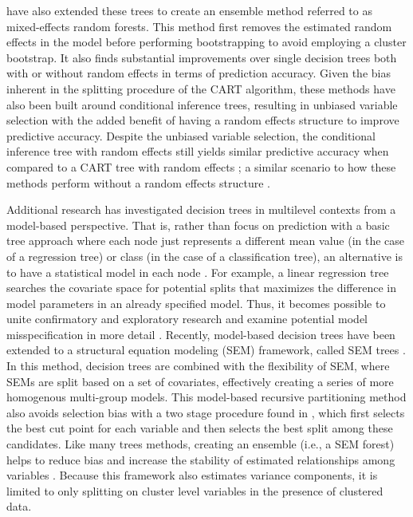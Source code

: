 	 have also extended these trees to create an ensemble method referred to as mixed-effects random forests. This method first removes the estimated random effects in the model before performing bootstrapping to avoid employing a cluster bootstrap. It also finds substantial improvements over single decision trees both with or without random effects in terms of prediction accuracy. Given the bias inherent in the splitting procedure of the CART algorithm, these methods have also been built around conditional inference trees, resulting in unbiased variable selection with the added benefit of having a random effects structure to improve predictive accuracy. Despite the unbiased variable selection, the conditional inference tree with random effects still yields similar predictive accuracy when compared to a CART tree with random effects \cite{fu2014unbiased}; a similar scenario to how these methods perform without a random effects structure \cite{strobl2007bias}.

	Additional research has investigated decision trees in multilevel contexts from a model-based perspective. That is, rather than focus on prediction with a basic tree approach where each node just represents a different mean value (in the case of a regression tree) or class (in the case of a classification tree), an alternative is to have a statistical model in each node \cite{zeileis2008model}. For example, a linear regression tree searches the covariate space for potential splits that maximizes the difference in model parameters in an already specified model. Thus, it becomes possible to unite confirmatory and exploratory research and examine potential model misspecification in more detail \cite{kopf2010potential}. Recently, model-based decision trees have been extended to a structural equation modeling (SEM) framework, called SEM trees \cite{brandmaier2013structural}. In this method, decision trees are combined with the flexibility of SEM, where SEMs are split based on a set of covariates, effectively creating a series of more homogenous multi-group models. This model-based recursive partitioning method also avoids selection bias with a two stage procedure found in , which first selects the best cut point for each variable and then selects the best split among these candidates. Like many trees methods, creating an ensemble (i.e., a SEM forest) helps to reduce bias and increase the stability of estimated relationships among variables \cite{prindle2014}. Because this framework also estimates variance components, it is limited to only splitting on cluster level variables in the presence of clustered data. 

